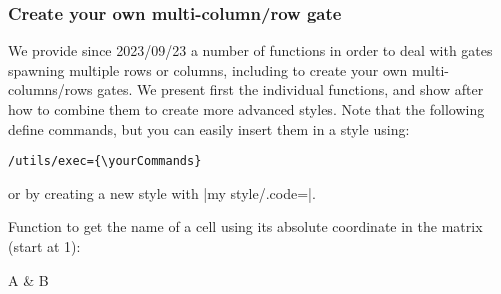 \documentclass[a4paper,doc2]{ltxdoc} %
\begin{document}
{\begin{pgfmanualentry}
\end{pgfmanualentry}




\subsubsection{Create your own multi-column/row gate}

We provide since 2023/09/23 a number of functions in order to deal with gates spawning multiple rows or columns, including to create your own multi-columns/rows gates. We present first the individual functions, and show after how to combine them to create more advanced styles. Note that the following define commands, but you can easily insert them in a style using:
\begin{verbatim}
/utils/exec={\yourCommands}
\end{verbatim}
or by creating a new style with |my style/.code={\yourCommand}|.

\begin{pgfmanualentry}
  \extractcommand\zxGetNameAbsoluteNode{}\@@
  \pgfmanualbody%
  Function to get the name of a cell using its absolute coordinate in the matrix (start at 1):
\begin{codeexample}[]
\begin{ZX}[
  execute at end picture={
    \node[draw, rounded corners, fill=orange,
    node on layer=background,
    fit=(\zxGetNameAbsoluteNode{1}{1})(\zxGetNameAbsoluteNode{1}{2})
    ]{};
  }]
  A & B
\end{ZX}
\end{codeexample}
\end{pgfmanualentry}

}
\end{document}
